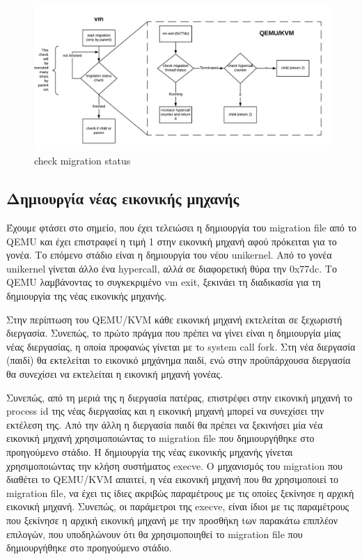 \begin{figure}[htp]
\centerline{\includegraphics[scale=0.75]{figures/check_migration_status.png}}
\caption{check migration status\label{fig4_9}}
\end{figure}

\subsection{Δημιουργία νέας εικονικής μηχανής}

Έχουμε φτάσει στο σημείο, που έχει τελειώσει η δημιουργία του migration file από
το QEMU και έχει επιστραφεί η τιμή 1 στην εικονική μηχανή αφού πρόκειται για το
γονέα. Το επόμενο στάδιο είναι η δημιουργία του νέου unikernel. Από το γονέα
unikernel γίνεται άλλο ένα hypercall, αλλά σε διαφορετική θύρα την 0x77dc. Το
QEMU λαμβάνοντας το συγκεκριμένο vm exit, ξεκινάει τη διαδικασία για τη
δημιουργία της νέας εικονικής μηχανής. 

Στην περίπτωση του QEMU/KVM κάθε εικονική μηχανή εκτελείται σε ξεχωριστή
διεργασία. Συνεπώς, το πρώτο πράγμα που πρέπει να γίνει είναι η δημιουργία μίας
νέας διεργασίας, η οποία προφανώς γίνεται με τo system call fork. Στη νέα
διεργασία (παιδί) θα εκτελείται το εικονικό μηχάνημα παιδί, ενώ στην
προϋπάρχουσα διεργασία θα συνεχίσει να εκτελείται η εικονική μηχανή γονέας.

Συνεπώς, από τη μεριά της η διεργασία πατέρας, επιστρέφει στην εικονική μηχανή
το process id της νέας διεργασίας και η εικονική μηχανή μπορεί να συνεχίσει την
εκτέλεση της. Από την άλλη η διεργασία παιδί θα πρέπει να ξεκινήσει μία νέα
εικονική μηχανή χρησιμοποιώντας το migration file που δημιουργήθηκε στο
προηγούμενο στάδιο. Η δημιουργία της νέας εικονικής μηχανής γίνεται
χρησιμοποιώντας την κλήση συστήματος execve. Ο μηχανισμός του migration που
διαθέτει το QEMU/KVM απαιτεί, η νέα εικονική μηχανή που θα χρησιμοποιεί το
migration file, να έχει τις ίδιες ακριβώς παραμέτρους με τις οποίες ξεκίνησε η
αρχική εικονική μηχανή. Συνεπώς, οι παράμετροι της execve, είναι ίδιοι με τις
παραμέτρους που ξεκίνησε η αρχική εικονική μηχανή με την προσθήκη tων παρακάτω
επιπλέον επιλογών, που υποδηλώνουν ότι θα χρησιμοποιηθεί το migration file που
δημιουργήθηκε στο προηγούμενο στάδιο.

